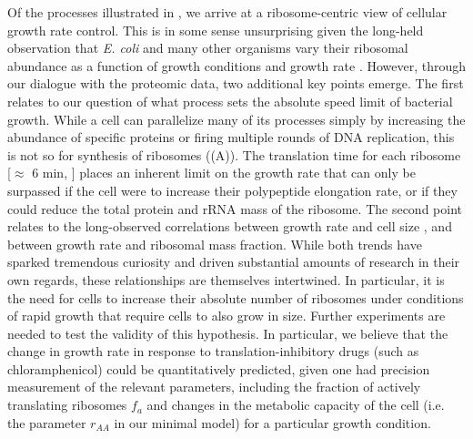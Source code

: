 Of the processes illustrated in , we arrive at a
ribosome-centric view of cellular growth rate control. This is in some sense
unsurprising given the long-held observation that \textit{E. coli} and many
other organisms vary their ribosomal abundance as a function of growth
conditions and growth rate \cite{scott2010, metzlraz2017}. However, through our
dialogue with the proteomic data, two additional key points emerge. The first
relates to our question of what process sets the absolute speed limit of
bacterial growth. While a cell can parallelize many of its processes simply by
increasing the abundance of specific proteins or firing multiple rounds of DNA
replication, this is not so for synthesis of ribosomes
((A)). The translation time for each ribosome [$\approx$ 6
min, \cite{dill2011}] places an inherent limit on the growth rate that can only
be surpassed if the cell were to increase their polypeptide elongation rate, or
if they could reduce the total protein and rRNA mass of the ribosome. The second
point relates to the long-observed correlations between growth rate and cell
size \citep{schaechter1958, si2017}, and between growth rate and ribosomal mass
fraction. While both trends have sparked tremendous curiosity and driven
substantial amounts of research in their own regards, these relationships are
themselves intertwined. In particular, it is the need for cells to increase
their absolute number of ribosomes under conditions of rapid growth that require
cells to also grow in size. Further experiments are needed to test the validity
of this hypothesis. In particular, we believe that the change in growth rate in
response to translation-inhibitory drugs (such as chloramphenicol) could be
quantitatively predicted, given one had precision measurement of the relevant
parameters, including the fraction of actively translating ribosomes $f_a$ and
changes in the metabolic capacity of the cell (i.e. the parameter $r_{AA}$ in
our minimal model) for a particular growth condition.

